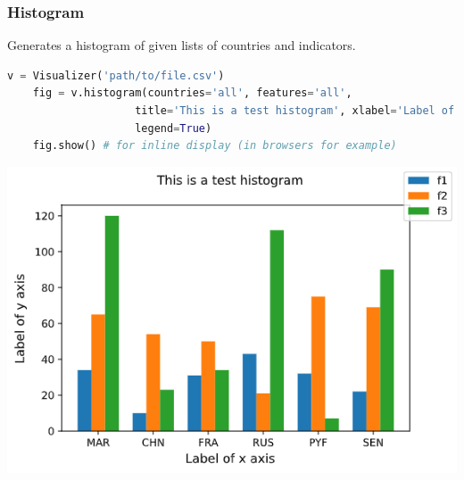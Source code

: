 \begin{frame}[fragile,shrink=30]
  \frametitle{Histogram}
  Generates a histogram of given lists of countries and indicators.
    \begin{lstlisting}[language=Python]
    v = Visualizer('path/to/file.csv')
    fig = v.histogram(countries='all', features='all',
                    title='This is a test histogram', xlabel='Label of x axis', ylabel='Label of y axis', 
                    legend=True)
    fig.show() # for inline display (in browsers for example)
    \end{lstlisting}
    \begin{center}
    \includegraphics[scale=0.6]{beamer/inc/graphics/histogram.png}
    \end{center}
\end{frame}